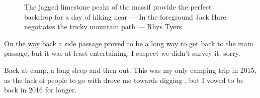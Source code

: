 \begin{figure}[t!]
\checkoddpage \ifoddpage \forcerectofloat \else \forceversofloat \fi
\centering
{}
\caption{The jagged limestone peaks of the  massif provide the perfect backdrop for a day of hiking near  --- In the foreground Jack Hare negotiates the tricky mountain path --- Rhys Tyers}
\label{kukjack}
\end{figure}

On the way back a side passage proved to be a long way to get back to the main passage, but it was at least entertaining. I suspect we didn't survey it, sorry.

Back at camp, a long sleep and then out. This was my only camping trip in 2015, as the lack of people to go with drove me towards digging , but I vowed to be back in 2016 for longer. 

